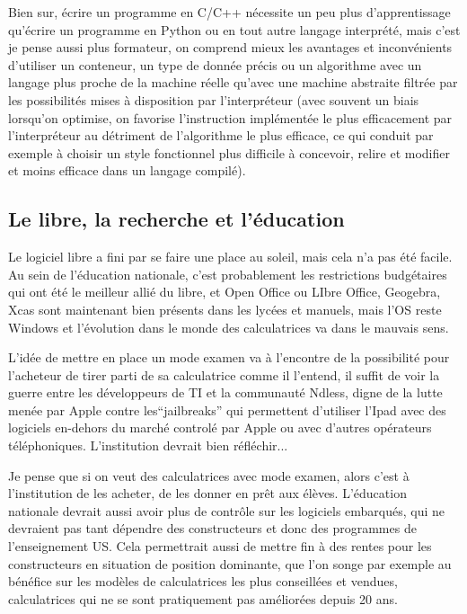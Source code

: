 \documentclass[a4paper,11pt]{article}
\begin{document}
Bien sur, \'ecrire un programme en C/C++ n\'ecessite
un peu plus d'apprentissage qu'\'ecrire un programme
en Python ou en tout autre langage interpr\'et\'e,
mais c'est je pense aussi plus formateur, on
comprend mieux les avantages et inconv\'enients
d'utiliser un conteneur, un type de donn\'ee pr\'ecis
ou un algorithme avec un langage plus proche de la machine
r\'eelle qu'avec une machine abstraite filtr\'ee par les
possibilit\'es mises \`a disposition par l'interpr\'eteur
(avec souvent un biais lorsqu'on optimise, on favorise
l'instruction impl\'ement\'ee le plus efficacement par
l'interpr\'eteur au d\'etriment de l'algorithme le plus
efficace, ce qui conduit par exemple \`a choisir un style fonctionnel
plus difficile \`a concevoir, relire et modifier et moins
efficace dans un langage compil\'e).


\subsection{Le libre, la recherche et l'\'education}
Le logiciel libre a fini par se faire une place au soleil,
mais cela n'a pas \'et\'e facile. Au sein de l'\'education
nationale, c'est probablement les restrictions budg\'etaires qui ont \'et\'e
le meilleur alli\'e du libre, et Open Office ou LIbre Office,
Geogebra, Xcas sont maintenant bien pr\'esents dans
les lyc\'ees et manuels, mais l'OS reste Windows et
l'\'evolution dans le monde des calculatrices va dans le mauvais sens.

L'id\'ee de mettre en place un mode examen va \`a l'encontre
de la possibilit\'e pour l'acheteur de tirer parti de sa calculatrice
comme il l'entend, il suffit de voir la guerre entre les
d\'eveloppeurs de TI et la communaut\'e Ndless, digne
de la lutte men\'ee par Apple contre les``jailbreaks''
qui permettent d'utiliser l'Ipad avec des logiciels en-dehors
du march\'e control\'e par Apple ou avec d'autres op\'erateurs
t\'el\'ephoniques. L'institution devrait bien r\'efl\'echir...

Je pense que si on veut des calculatrices avec mode examen,
alors c'est \`a l'institution de les acheter, de les donner
en pr\^et aux \'el\`eves. L'\'education nationale devrait aussi
avoir plus de contr\^ole sur les logiciels
embarqu\'es, qui ne devraient pas tant
d\'ependre des constructeurs
et donc des programmes de l'enseignement US. Cela permettrait
aussi de mettre fin \`a des rentes pour les constructeurs
en situation de position dominante, que l'on songe par
exemple au b\'en\'efice sur les mod\`eles de calculatrices les plus
conseill\'ees et vendues, calculatrices qui ne se sont
pratiquement pas am\'elior\'ees depuis 20 ans.
\end{document}
